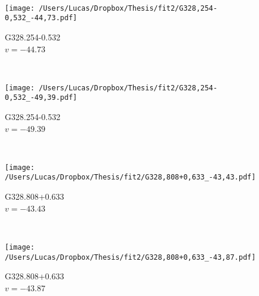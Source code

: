 \begin{figure*}[t]
\begin{subfigure}[t]{0.3\textwidth}
	\end{subfigure}
	~
	\begin{subfigure}[t]{0.3\textwidth}
		\texttt{[image: /Users/Lucas/Dropbox/Thesis/fit2/G328,254-0,532\_-44,73.pdf]}
		\caption[]{G328.254-0.532\\$v=-44.73$\,\kms}
	\end{subfigure}
	~
	\begin{subfigure}[t]{0.3\textwidth}
		\texttt{[image: /Users/Lucas/Dropbox/Thesis/fit2/G328,254-0,532\_-49,39.pdf]}
		\caption[]{G328.254-0.532\\$v=-49.39$\,\kms}
	\end{subfigure}
	~
	\begin{subfigure}[t]{0.3\textwidth}
		\texttt{[image: /Users/Lucas/Dropbox/Thesis/fit2/G328,808+0,633\_-43,43.pdf]}
		\caption[]{G328.808+0.633\\$v=-43.43$\,\kms}
	\end{subfigure}
	~
	\begin{subfigure}[t]{0.3\textwidth}
		\texttt{[image: /Users/Lucas/Dropbox/Thesis/fit2/G328,808+0,633\_-43,87.pdf]}
		\caption[]{G328.808+0.633\\$v=-43.87$\,\kms}
	\end{subfigure}
	~
\end{figure*}
\clearpage

